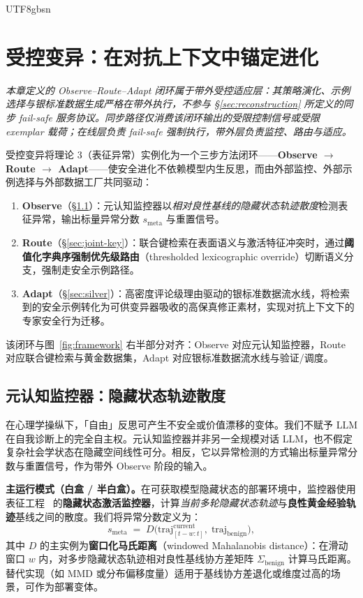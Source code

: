 \documentclass[letterpaper,twocolumn,10pt]{article}
\begin{document}
\begin{CJK}{UTF8}{gbsn}
\section{受控变异：在对抗上下文中锚定进化}
\label{sec:mutation}

\noindent\textit{本章定义的 Observe--Route--Adapt 闭环属于带外受控适应层：其策略演化、示例选择与银标准数据生成严格在带外执行，不参与 \S\ref{sec:reconstruction} 所定义的同步 fail-safe 服务协议。同步路径仅消费该闭环输出的受限控制信号或受限 exemplar 载荷；在线层负责 fail-safe 强制执行，带外层负责监控、路由与适应。}

受控变异将理论 3（表征异常）实例化为一个三步方法闭环——\textbf{Observe $\to$ Route $\to$ Adapt}——使安全进化不依赖模型内生反思，而由外部监控、外部示例选择与外部数据工厂共同驱动：

\begin{enumerate}[nosep,leftmargin=*]
\item \textbf{Observe}（\S\ref{sec:metacog}）：元认知监控器以\emph{相对良性基线的隐藏状态轨迹散度}检测表征异常，输出标量异常分数 $s_{\mathrm{meta}}$ 与重置信号。
\item \textbf{Route}（\S\ref{sec:joint-key}）：联合键检索在表面语义与激活特征冲突时，通过\textbf{阈值化字典序强制优先级路由}（thresholded lexicographic override）切断语义分支，强制走安全示例路径。
\item \textbf{Adapt}（\S\ref{sec:silver}）：高密度评论级理由驱动的银标准数据流水线，将检索到的安全示例转化为可供变异器吸收的高保真修正素材，实现对抗上下文下的专家安全行为迁移。
\end{enumerate}

\noindent 该闭环与图~\ref{fig:framework} 右半部分对齐：Observe 对应元认知监控器，Route 对应联合键检索与黄金数据集，Adapt 对应银标准数据流水线与验证/调度。

\subsection{元认知监控器：隐藏状态轨迹散度}
\label{sec:metacog}

在心理学操纵下，「自由」反思可产生不安全或价值漂移的变体。我们不赋予 LLM 在自我诊断上的完全自主权。元认知监控器并非另一全规模对话 LLM，也不假定复杂社会学状态在隐藏空间线性可分。相反，它以异常检测的方式输出标量异常分数与重置信号，作为带外 Observe 阶段的输入。

\textbf{主运行模式（白盒 / 半白盒）。}在可获取模型隐藏状态的部署环境中，监控器使用表征工程~\cite{rep-eng} 的\textbf{隐藏状态激活监控器}，计算\emph{当前多轮隐藏状态轨迹}与\textbf{良性黄金经验轨迹}基线之间的散度。我们将异常分数定义为：
\[
s_{\mathrm{meta}} \;=\; D\bigl(\mathrm{traj}^{\mathrm{current}}_{[t-w:t]},\;\mathrm{traj}_{\mathrm{benign}}\bigr),
\]
其中 $D$ 的主实例为\textbf{窗口化马氏距离}（windowed Mahalanobis distance）：在滑动窗口 $w$ 内，对多步隐藏状态轨迹相对良性基线协方差矩阵 $\Sigma_{\mathrm{benign}}$ 计算马氏距离。替代实现（如 MMD 或分布偏移度量）适用于基线协方差退化或维度过高的场景，可作为部署变体。


\end{CJK}
\end{document}
